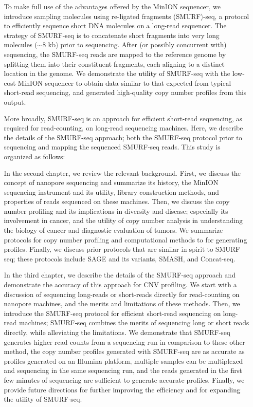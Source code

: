 To make full use of the advantages offered by the MinION sequencer, we
introduce sampling molecules using re-ligated fragments (SMURF)-seq, a
protocol to efficiently sequence short DNA molecules on a long-read
sequencer. The strategy of SMURF-seq is to concatenate short fragments
into very long molecules ($\sim$8 kb) prior to sequencing. After (or
possibly concurrent with) sequencing, the SMURF-seq reads are mapped to
the reference genome by splitting them into their constituent fragments,
each aligning to a distinct location in the genome.
%
We demonstrate the utility of SMURF-seq with the low-cost MinION
sequencer to obtain data similar to that expected from typical
short-read sequencing, and generated high-quality copy number profiles
from this output.

More broadly, SMURF-seq is an approach for efficient short-read
sequencing, as required for read-counting, on long-read sequencing
machines. Here, we describe the details of the SMURF-seq approach; both
the SMURF-seq protocol prior to sequencing and mapping the sequenced
SMURF-seq reads. This study is organized as follows:

In the second chapter, we review the relevant background.  First, we
discuss the concept of nanopore sequencing and summarize its history,
the MinION sequencing instrument and its utility, library construction
methods, and properties of reads sequenced on these machines.
%
Then, we discuss the copy number profiling and its implications in
diversity and disease; especially its involvement in cancer, and the
utility of copy number analysis in understanding the biology of cancer
and diagnostic evaluation of tumors. We summarize protocols for copy
number profiling and computational methods to for generating profiles.
%
Finally, we discuss prior protocols that are similar in spirit to
SMURF-seq; these protocols include SAGE and its variants, SMASH, and
Concat-seq.

In the third chapter, we describe the details of the SMURF-seq approach
and demonstrate the accuracy of this approach for CNV profiling.  We
start with a discussion of sequencing long-reads or short-reads directly
for read-counting on nanopore machines, and the merits and limitations
of these methods.
%
Then, we introduce the SMURF-seq protocol for efficient short-read
sequencing on long-read machines; SMURF-seq combines the merits of
sequencing long or short reads directly, while alleviating the
limitations.
%
We demonstrate that SMURF-seq generates higher read-counts from a
sequencing run in comparison to these other method, the copy number
profiles generated with SMURF-seq are as accurate as profiles generated
on an Illumina platform, multiple samples can be multiplexed and
sequencing in the same sequencing run, and the reads generated in the
first few minutes of sequencing are sufficient to generate accurate
profiles.
%
Finally, we provide future directions for further improving the
efficiency and for expanding the utility of SMURF-seq.

